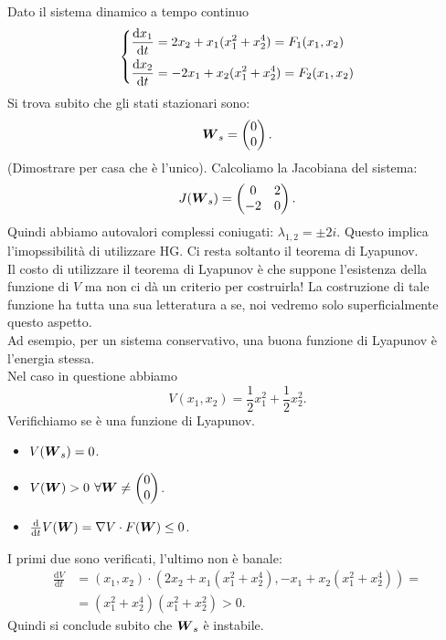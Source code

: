 \begin{exmp}[]
    Dato il sistema dinamico a tempo continuo
    \[
    \begin{dcases}
	\frac{\text{d} x_1}{\text{d} t} = 2x_2 + x_1(x_1^2 + x_2^4) = F_1(x_1,x_2)  \\
	\frac{\text{d} x_2}{\text{d} t} = -2x_1 + x_2(x_1^2 + x_2^4) = F_2(x_1,x_2) 
    \end{dcases}
    \]
    Si trova subito che gli stati stazionari sono:
    \[
        \boldsymbol{W}_s = \begin{pmatrix} 0 \\ 0 \end{pmatrix}
    .\] 
    (Dimostrare per casa che è l'unico). Calcoliamo la Jacobiana del sistema:
    \[
	J(\boldsymbol{W}_s) =
    \begin{pmatrix}
	0  & 2 \\
	-2 & 0 \\
    \end{pmatrix}
    .\] 
    Quindi abbiamo autovalori complessi coniugati: $\lambda_{1,2} = \pm 2i$. Questo implica l'imopssibilità di utilizzare HG. Ci resta soltanto il teorema di Lyapunov.\\
    Il costo di utilizzare il teorema di Lyapunov è che suppone l'esistenza della funzione di $V$ ma non ci dà un criterio per costruirla! La costruzione di tale funzione ha tutta una sua letteratura a se, noi vedremo solo superficialmente questo aspetto.\\
    Ad esempio, per un sistema conservativo, una buona funzione di Lyapunov è l'energia stessa.\\ 
    Nel caso in questione abbiamo
    \[
	V(x_1, x_2) = \frac{1}{2}x_1^2 + \frac{1}{2}x_2^2
    .\] 
    Verifichiamo se è una funzione di Lyapunov.
    \begin{itemize}
	\item $V(\boldsymbol{W}_s) = 0$.
	\item $V(\boldsymbol{W})>0 $  $ \forall \boldsymbol{W}\neq \begin{pmatrix} 0 \\ 0 \end{pmatrix}$.
	\item $\frac{\text{d} }{\text{d} t} V(\boldsymbol{W}) = \nabla V \cdot F(\boldsymbol{W})  \le 0$.
    \end{itemize}
    I primi due sono verificati, l'ultimo non è banale:
    \[\begin{aligned}
	\frac{\text{d} V}{\text{d} t} &= (x_1, x_2) \cdot (2x_2 + x_1(x_1^2 + x_2^4) , - x_1 + x_2(x_1^2 + x_2^4)  ) =\\
				      &= (x_1^2 + x_2^4) (x_1^2 + x_2^2) >0
    .\end{aligned}\]
    Quindi si conclude subito che $\boldsymbol{W}_s$ è instabile.
\end{exmp}
